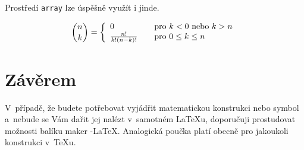 \documentclass[11pt,a4paper,twocolumn]{article}
\begin{document}
  Prostředí \texttt{array} lze úspěšně využít i jinde.

  \[
    \binom{n}{k} =
    \left\{
      \begin{array}{l l}
        0                   & \quad \text{pro } k<0 \text{ nebo } k>n  \\
        \frac{n!}{k!(n-k)!} & \quad \text{pro } 0 \leq k \leq n
      \end{array}
    \right.
  \]

\section{Závěrem}
  V~případě, že budete potřebovat vyjádřit ma\-te\-ma\-tickou konstrukci nebo symbol a~nebude se
  Vám dařit jej nalézt v~samotném \LaTeX u, doporučuji prostudovat možnosti balíku maker
  \AmS-\LaTeX. Analogická poučka platí obecně pro jakoukoli konstrukci v~\TeX u.
\end{document}
